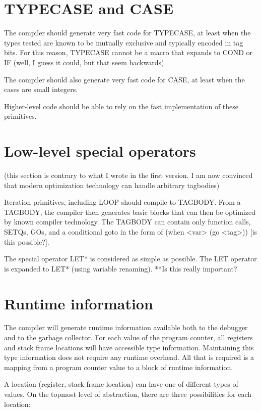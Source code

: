 \documentclass{article}
\begin{document}
\section{TYPECASE and CASE}

The compiler should generate very fast code for TYPECASE, at least
when the types tested are known to be mutually exclusive and typically
encoded in tag bits.  For this reason, TYPECASE cannot be a macro that
expands to COND or IF (well, I guess it could, but that seem backwards).

The compiler should also generate very fast code for CASE, at least
when the cases are small integers.  

Higher-level code should be able to rely on the fast implementation of
these primitives. 

\section{Low-level special operators}

(this section is contrary to what I wrote in the first version.  I am
now convinced that modern optimization technology can handle arbitrary
tagbodies)

Iteration primitives, including LOOP should compile to TAGBODY.  From
a TAGBODY, the compiler then generates basic blocks that can then be
optimized by known compiler technology.  The TAGBODY can contain only
function calls, SETQs, GOs, and a conditional goto in the form of
(when <var> (go <tag>)) [is this possible?].

The special operator LET* is considered as simple as possible.  The
LET operator is expanded to LET* (using variable renaming).  **Is this
really important?

\section{Runtime information}

The compiler will generate runtime information available both to the
debugger and to the garbage collector.  For each value of the program
counter, all registers and stack frame locations will have accessible
type information.  Maintaining this type information does not require
any runtime overhead.  All that is required is a mapping from a
program counter value to a block of runtime information. 

A location (register, stack frame location) can have one of different
types of values.  On the topmost level of abstraction, there are three
possibilities for each location:
\end{document}
